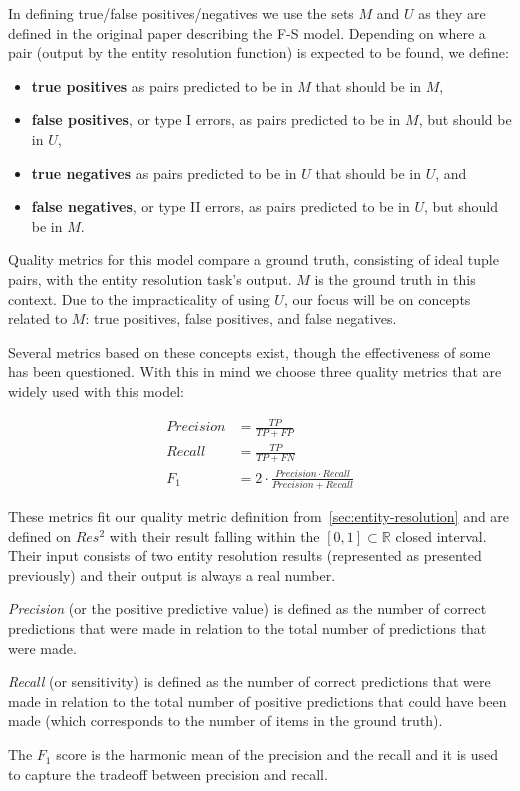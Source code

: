 In defining true/false positives/negatives we use the sets $M$ and $U$ as
they are defined in the original paper describing the F-S model.
Depending on where a pair (output by the entity resolution function) is
expected to be found, we define:

\begin{itemize}
    \item \textbf{true positives} as pairs predicted to be in $M$ that
    should be in $M$,
    \item \textbf{false positives}, or type I errors, as pairs predicted to
    be in $M$, but should be in $U$,
    \item \textbf{true negatives} as pairs predicted to be in $U$ that
    should be in $U$, and
    \item \textbf{false negatives}, or type II errors, as pairs predicted to
    be in $U$, but should be in $M$.
\end{itemize}

Quality metrics for this model compare a ground truth, consisting of ideal
tuple pairs, with the entity resolution task's output.
$M$ is the ground truth in this context.
Due to the impracticality of using $U$, our focus will be on concepts
related to $M$: true positives, false positives, and false negatives.

Several metrics based on these concepts exist, though the effectiveness of
some has been questioned\cite{Goga2015}.
With this in mind we choose three quality metrics that are widely used with
this model:

\begin{align}
Precision &= \frac{TP}{TP+FP}\nonumber \\
Recall &= \frac{TP}{TP+FN}\nonumber \\
F_1 &= 2 \cdot \frac{Precision \cdot Recall}{Precision+Recall}\nonumber
\end{align}

These metrics fit our quality metric definition from~\ref{sec:entity-resolution}
and are defined on $Res^2$ with their result falling within the
$\left[0, 1\right] \subset \mathbb{R}$ closed interval.
Their input consists of two entity resolution results (represented as presented
previously) and their output is always a real number.

\textit{Precision} (or the positive predictive value) is defined as the
number of correct predictions that were made in relation to the total number
of predictions that were made.

\textit{Recall} (or sensitivity) is defined as the number of correct
predictions that were made in relation to the total number of positive
predictions that could have been made (which corresponds to the number of
items in the ground truth).

The \textit{$F_1$} score is the harmonic mean of the precision and the
recall and it is used to capture the tradeoff between precision and
recall\cite{hitesh2012}.

